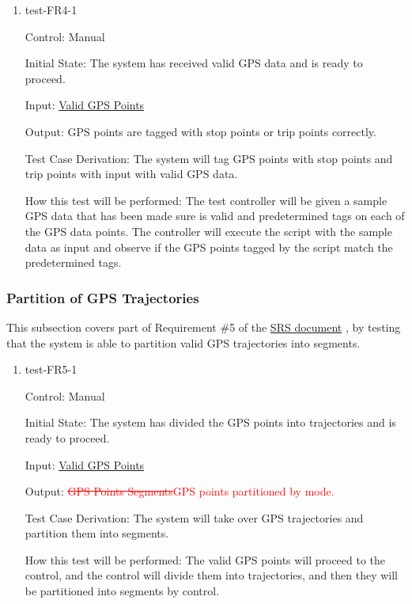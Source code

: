 \documentclass[12pt, titlepage]{article}
\begin{document}
\begin{enumerate}

\item{test-FR4-1\\} \label{test-FR4-1}

Control: Manual 
					
Initial State: The system has received valid GPS data and is ready to proceed. 
					
Input: \href{https://github.com/paezha/PyERT-BLACK/blob/rev0-test/quarto-example/data/sample-gps/sample-gps-1.csv}{Valid GPS Points}
					
Output: GPS points are tagged with stop points or trip points correctly.

Test Case Derivation: The system will tag GPS points with stop points and trip points with input with valid GPS data.
					
How this test will be performed: The test controller will be given a sample GPS data that has been made sure is valid and predetermined tags on each of the GPS data points. The controller will execute the script with the sample data as input and observe if the GPS points tagged by the script match the predetermined tags.

\end{enumerate}

\subsubsection{Partition of GPS Trajectories}

This subsection covers part of Requirement \#5 of the \href{https://github.com/paezha/PyERT-BLACK/blob/main/docs/SRS/SRS.pdf}{SRS document} \citep{SRS}, by testing that the system is able to partition valid GPS trajectories into segments.

\begin{enumerate}

\item{test-FR5-1\\} \label{test-FR5-1}

Control: Manual 
					
Initial State: The system has divided the GPS points into trajectories and is ready to proceed.
					
Input: \href{https://github.com/paezha/PyERT-BLACK/blob/rev0-test/quarto-example/data/sample-gps/sample-gps-1.csv}{Valid GPS Points}
					
Output: \textcolor{red}{\sout{GPS Points Segments}GPS points partitioned by mode.} 

Test Case Derivation: The system will take over GPS trajectories and partition them into segments.
					
How this test will be performed: The valid GPS points will proceed to the control, and the control will divide them into trajectories, and then they will be partitioned into segments by control.

\end{enumerate}
\end{document}
